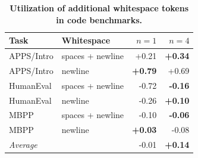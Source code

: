\documentclass{article}
\theoremstyle{plain}
\theoremstyle{definition}
\theoremstyle{remark}
\begin{document}
\begin{table}[H]
\centering
\caption{\textbf{Utilization of additional whitespace tokens in code benchmarks.}}
\label{tab:pause}
\begin{tabular}{llrr}
\toprule
Task  & Whitespace & $n = 1$      &  $n = 4$     \\
\midrule
APPS/Intro & spaces + newline &  +0.21 &  \textbf{+0.34} \\
APPS/Intro & newline  &  \textbf{+0.79} &  +0.69 \\
HumanEval & spaces + newline & -0.72 & \textbf{-0.16} \\
HumanEval & newline  & -0.26 &  \textbf{+0.10} \\
MBPP & spaces + newline & -0.10 & \textbf{-0.06} \\
MBPP & newline  &  \textbf{+0.03} & -0.08 \\
\midrule
\emph{Average} & & -0.01 & \textbf{+0.14} \\
\bottomrule
\end{tabular}
\end{table}
\end{document}
